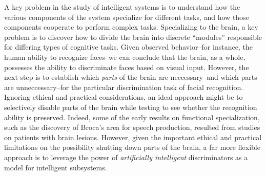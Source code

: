 A key problem in the study of intelligent systems is to understand how
the various components of the system specialize for different tasks,
and how those components cooperate to perform complex tasks.
Specializing to the brain, a key problem is to discover how to divide
the brain into discrete ``modules'' responsible for differing types of
cognitive tasks.  Given observed behavior--for instance, the human
ability to recognize faces--we can conclude that the brain, as a
whole, possesses the ability to discriminate faces based on visual
input.  However, the next step is to establish which \emph{parts} of
the brain are neccessary--and which parts are unneccessary--for the
particular discrimination task of facial recognition.  Ignoring
ethical and practical considerations, an ideal approach might be to
selectively disable parts of the brain while testing to see whether
the recognition ability is preserved.  Indeed, some of the early
results on functional specialization, such as the discovery of Broca's
area for speech production, resulted from studies on patients with
brain lesions.  However, given the important ethical and practical
limitations on the possibility shutting down parts of the brain, a far
more flexible approach is to leverage the power of \emph{artificially
  intelligent} discriminators as a model for intelligent subsystems. 





